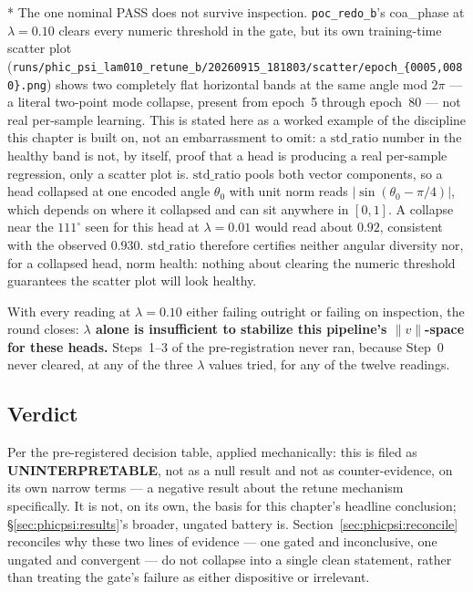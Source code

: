 * The one nominal PASS does not survive inspection.
\texttt{poc\_redo\_b}'s coa\_phase at $\lambda=0.10$ clears every numeric threshold in the gate, but its own training-time scatter plot (\texttt{runs/phic\_psi\_lam010\_retune\_b/20260915\_181803/scatter/epoch\_\{0005,0080\}.png}) shows two completely flat horizontal bands at the same angle mod $2\pi$ --- a literal two-point mode collapse, present from epoch~5 through epoch~80 --- not real per-sample learning.
This is stated here as a worked example of the discipline this chapter is built on, not an embarrassment to omit: a $\text{std\_ratio}$ number in the healthy band is not, by itself, proof that a head is producing a real per-sample regression, only a scatter plot is.
$\text{std\_ratio}$ pools both vector components, so a head collapsed at one encoded angle $\theta_0$ with unit norm reads $|\sin(\theta_0-\pi/4)|$, which depends on where it collapsed and can sit anywhere in $[0,1]$.
A collapse near the $111^\circ$ seen for this head at $\lambda=0.01$ would read about $0.92$, consistent with the observed $0.930$.
$\text{std\_ratio}$ therefore certifies neither angular diversity nor, for a collapsed head, norm health: nothing about clearing the numeric threshold guarantees the scatter plot will look healthy.

With every reading at $\lambda=0.10$ either failing outright or failing on inspection, the round closes: \textbf{$\lambda$ alone is insufficient to stabilize this pipeline's $\|v\|$-space for these heads.}
Steps~1--3 of the pre-registration never ran, because Step~0 never cleared, at any of the three $\lambda$ values tried, for any of the twelve readings.

\subsection{Verdict}
\label{sec:phicpsi:prereg:verdict}

Per the pre-registered decision table, applied mechanically: this is filed as \textbf{UNINTERPRETABLE}, not as a null result and not as counter-evidence, on its own narrow terms --- a negative result about the retune mechanism specifically.
It is not, on its own, the basis for this chapter's headline conclusion; \S\ref{sec:phicpsi:results}'s broader, ungated battery is.
Section~\ref{sec:phicpsi:reconcile} reconciles why these two lines of evidence --- one gated and inconclusive, one ungated and convergent --- do not collapse into a single clean statement, rather than treating the gate's failure as either dispositive or irrelevant.


